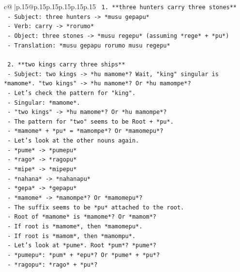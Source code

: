 \documentclass{article}
\begin{document}
{\begin{supertabular}{c@{$\;$}|p{.15\linewidth}@{}p{.15\linewidth}p{.15\linewidth}p{.15\linewidth}p{.15\linewidth}p{.15\linewidth}}
{{{\texttt{  1. **three hunters carry three stones**} \\
\texttt{     {-} Subject: three hunters {-}> *musu gepapu*} \\
\texttt{     {-} Verb: carry {-}> *rorumo*} \\
\texttt{     {-} Object: three stones {-}> *musu regepu* (assuming *rege* + *pu*)} \\
\texttt{     {-} Translation: *musu gepapu rorumo musu regepu*} \\
\\ 
\texttt{  2. **two kings carry three ships**} \\
\texttt{     {-} Subject: two kings {-}> *hu mamome*? Wait, "king" singular is *mamome*. "two kings" {-}> *hu mamome*? Or *hu mamompe*?} \\
\texttt{     {-} Let's check the pattern for "king".} \\
\texttt{     {-} Singular: *mamome*.} \\
\texttt{     {-} "two kings" {-}> *hu mamome*? Or *hu mamompe*?} \\
\texttt{     {-} The pattern for "two" seems to be Root + *pu*.} \\
\texttt{     {-} *mamome* + *pu* = *mamompe*? Or *mamomepu*?} \\
\texttt{     {-} Let's look at the other nouns again.} \\
\texttt{     {-} *pume* {-}> *pumepu*} \\
\texttt{     {-} *rago* {-}> *ragopu*} \\
\texttt{     {-} *mipe* {-}> *mipepu*} \\
\texttt{     {-} *nahana* {-}> *nahanapu*} \\
\texttt{     {-} *gepa* {-}> *gepapu*} \\
\texttt{     {-} *mamome* {-}> *mamompe*? Or *mamomepu*?} \\
\texttt{     {-} The suffix seems to be *pu* attached to the root.} \\
\texttt{     {-} Root of *mamome* is *mamome*? Or *mamom*?} \\
\texttt{     {-} If root is *mamome*, then *mamomepu*.} \\
\texttt{     {-} If root is *mamom*, then *mamompu*.} \\
\texttt{     {-} Let's look at *pume*. Root *pum*? *pume*?} \\
\texttt{     {-} *pumepu*: *pum* + *epu*? Or *pume* + *pu*?} \\
\texttt{     {-} *ragopu*: *rago* + *pu*?} \\
}}}
\end{supertabular}}
\end{document}
